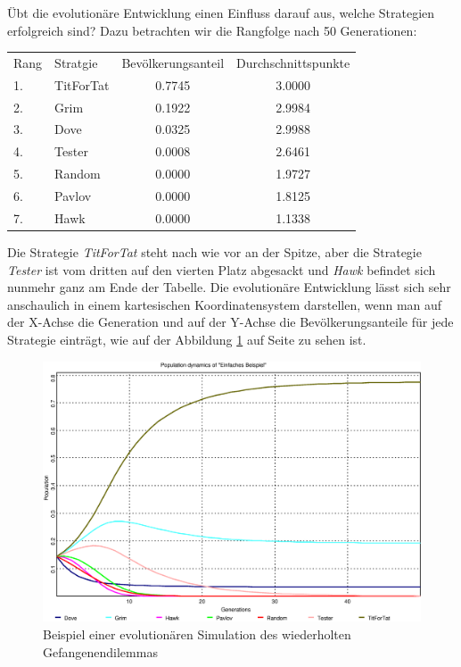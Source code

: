 Übt die evolutionäre Entwicklung einen Einfluss darauf aus, welche Strategien
erfolgreich sind? Dazu betrachten wir die Rangfolge nach 50 Generationen:
\begin{center}
\begin{tabular}{llcc}
Rang & Stratgie & Bevölkerungsanteil & Durchschnittspunkte \\ \cline{1-4}
  1. & TitForTat      &               0.7745 & 3.0000 \\  
  2. & Grim           &               0.1922 & 2.9984\\
  3. & Dove           &               0.0325 & 2.9988\\
  4. & Tester         &               0.0008 & 2.6461\\
  5. & Random         &               0.0000 & 1.9727\\
  6. & Pavlov         &               0.0000 & 1.8125\\
  7. & Hawk           &               0.0000 & 1.1338\\
\end{tabular}
\end{center}
Die Strategie {\em TitForTat} steht nach wie vor an der Spitze, aber die
Strategie {\em Tester} ist vom dritten auf den vierten Platz abgesackt und
{\em Hawk} befindet sich nunmehr ganz am Ende der Tabelle. Die evolutionäre
Entwicklung lässt sich sehr anschaulich in einem kartesischen Koordinatensystem
darstellen, wenn man auf der X-Achse die Generation und auf der Y-Achse die
Bevölkerungsanteile für jede Strategie einträgt, wie auf der Abbildung
\ref{BeispielEvolution} auf Seite \pageref{BeispielEvolution} zu sehen ist.
\begin{figure}
\begin{center}
\includegraphics[width=12cm]{Grafiken/Einfaches_Beispiel.eps}
\caption{\label{BeispielEvolution} Beispiel einer evolutionären
Simulation des wiederholten Gefangenendilemmas}
\end{center}
\end{figure}
